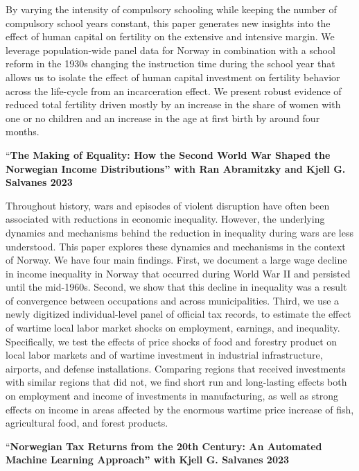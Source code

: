 \documentclass[11pt,]{article}
\begin{document}
By varying the intensity of compulsory schooling while keeping the
number of compulsory school years constant, this paper generates new
insights into the effect of human capital on fertility on the extensive
and intensive margin. We leverage population-wide panel data for Norway
in combination with a school reform in the 1930s changing the
instruction time during the school year that allows us to isolate the
effect of human capital investment on fertility behavior across the
life-cycle from an incarceration effect. We present robust evidence of
reduced total fertility driven mostly by an increase in the share of
women with one or no children and an increase in the age at first birth
by around four months.\vspace{0.3cm}\vspace{-0.2cm}

``\textbf{The Making of Equality: How the Second World War Shaped the
Norwegian Income Distributions'' with Ran Abramitzky and Kjell G.
Salvanes \hfill 2023}

Throughout history, wars and episodes of violent disruption have often
been associated with reductions in economic inequality. However, the
underlying dynamics and mechanisms behind the reduction in inequality
during wars are less understood. This paper explores these dynamics and
mechanisms in the context of Norway. We have four main findings. First,
we document a large wage decline in income inequality in Norway that
occurred during World War II and persisted until the mid-1960s. Second,
we show that this decline in inequality was a result of convergence
between occupations and across municipalities. Third, we use a newly
digitized individual-level panel of official tax records, to estimate
the effect of wartime local labor market shocks on employment, earnings,
and inequality. Specifically, we test the effects of price shocks of
food and forestry product on local labor markets and of wartime
investment in industrial infrastructure, airports, and defense
installations. Comparing regions that received investments with similar
regions that did not, we find short run and long-lasting effects both on
employment and income of investments in manufacturing, as well as strong
effects on income in areas affected by the enormous wartime price
increase of fish, agricultural food, and forest products.
\vspace{0.3cm}\vspace{-0.2cm}

``\textbf{Norwegian Tax Returns from the 20th Century: An Automated
Machine Learning Approach'' with Kjell G. Salvanes \hfill 2023}
\end{document}
